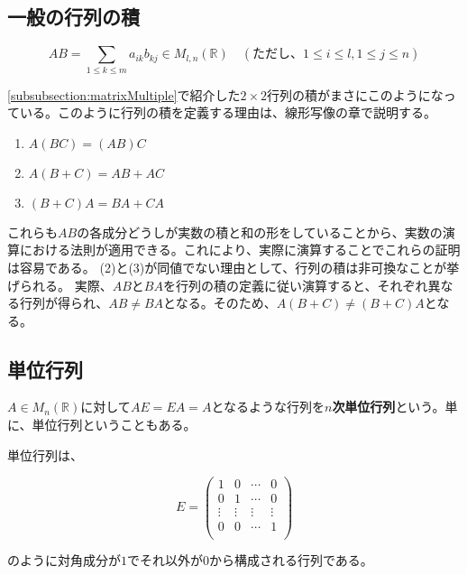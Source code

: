 \documentclass[dvipdfmx,autodetect-engine]{jsarticle}
\begin{document}
\subsection{一般の行列の積}

\label{defi:matrixMultiple}

$$
AB = \sum_{1 \leq k \leq m} a_{ik}b_{kj} \in M_{l, n}(\mathbb{R})
\quad (ただし、1 \leq i \leq l, 1 \leq j \leq n)
$$

\ref{subsubsection:matrixMultiple}で紹介した$2 \times 2$行列の積がまさにこのようになっている。このように行列の積を定義する理由は、線形写像の章で説明する。


\begin{enumerate}
\renewcommand{\labelenumi}{(\arabic{enumi})}
\item $A(BC) = (AB)C$
\item $A(B+C) = AB + AC$
\item $(B+C)A = BA + CA$
\end{enumerate}

これらも$AB$の各成分どうしが実数の積と和の形をしていることから、実数の演算における法則が適用できる。これにより、実際に演算することでこれらの証明は容易である。
(2)と(3)が同値でない理由として、行列の積は非可換なことが挙げられる。
実際、$AB$と$BA$を行列の積の定義に従い演算すると、それぞれ異なる行列が得られ、$AB \neq BA$となる。そのため、$A(B+C) \neq (B+C)A$となる。

\subsection{単位行列}


$A \in M_n(\mathbb{R})$に対して$AE = EA = A$となるような行列を{\bf $n$次単位行列}という。単に、単位行列ということもある。

単位行列は、

$$
E = \begin{pmatrix}
1 & 0 & \cdots & 0 \\
0 & 1 & \cdots & 0 \\
\vdots & \vdots & \vdots & \vdots \\
0 & 0 & \cdots & 1 \\
\end{pmatrix}
$$

のように対角成分が$1$でそれ以外が$0$から構成される行列である。
\end{document}
